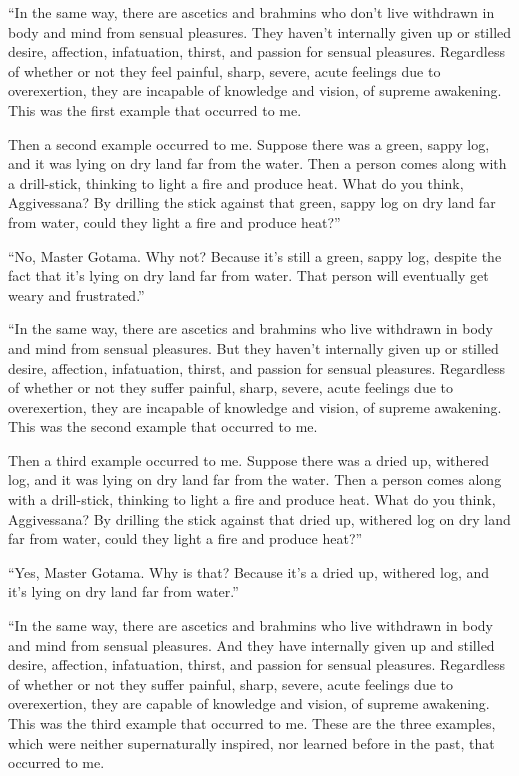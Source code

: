 \documentclass[12pt,openany]{book}%
\begin{document}
“In the same way, there are ascetics and brahmins who don’t live withdrawn in body and mind from sensual pleasures. They haven’t internally given up or stilled desire, affection, infatuation, thirst, and passion for sensual pleasures. Regardless of whether or not they feel painful, sharp, severe, acute feelings due to overexertion, they are incapable of knowledge and vision, of supreme awakening. This was the first example that occurred to me. 

Then a second example occurred to me. Suppose there was a green, sappy log, and it was lying on dry land far from the water. Then a person comes along with a drill-stick, thinking to light a fire and produce heat. What do you think, Aggivessana? By drilling the stick against that green, sappy log on dry land far from water, could they light a fire and produce heat?” 

“No, Master Gotama. Why not? Because it’s still a green, sappy log, despite the fact that it’s lying on dry land far from water. That person will eventually get weary and frustrated.” 

“In the same way, there are ascetics and brahmins who live withdrawn in body and mind from sensual pleasures. But they haven’t internally given up or stilled desire, affection, infatuation, thirst, and passion for sensual pleasures. Regardless of whether or not they suffer painful, sharp, severe, acute feelings due to overexertion, they are incapable of knowledge and vision, of supreme awakening. This was the second example that occurred to me. 

Then a third example occurred to me. Suppose there was a dried up, withered log, and it was lying on dry land far from the water. Then a person comes along with a drill-stick, thinking to light a fire and produce heat. What do you think, Aggivessana? By drilling the stick against that dried up, withered log on dry land far from water, could they light a fire and produce heat?” 

“Yes, Master Gotama. Why is that? Because it’s a dried up, withered log, and it’s lying on dry land far from water.” 

“In the same way, there are ascetics and brahmins who live withdrawn in body and mind from sensual pleasures. And they have internally given up and stilled desire, affection, infatuation, thirst, and passion for sensual pleasures. Regardless of whether or not they suffer painful, sharp, severe, acute feelings due to overexertion, they are capable of knowledge and vision, of supreme awakening. This was the third example that occurred to me. These are the three examples, which were neither supernaturally inspired, nor learned before in the past, that occurred to me. 
\end{document}
